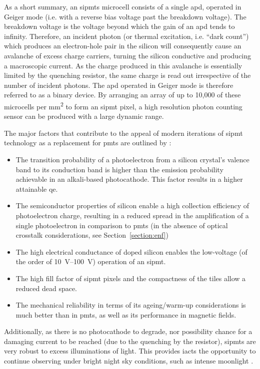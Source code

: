 As a short summary, an \glspl{sipmt} microcell consists of a single \gls{apd}, operated in Geiger mode (i.e. with a reverse bias voltage past the breakdown voltage). The breakdown voltage is the voltage beyond which the gain of an \gls{apd} tends to infinity. Therefore, an incident photon (or thermal excitation, i.e. ``dark count'') which produces an electron-hole pair in the silicon will consequently cause an avalanche of excess charge carriers, turning the silicon conductive and producing a macroscopic current. As the charge produced in this avalanche is essentially limited by the quenching resistor, the same charge is read out irrespective of the number of incident photons. The \gls{apd} operated in Geiger mode is therefore referred to as a binary device. By arranging an array of up to 10,000 of these microcells per \si{mm\squared} to form an \gls{sipmt} pixel, a high resolution photon counting sensor can be produced with a large dynamic range.

The major factors that contribute to the appeal of modern iterations of \gls{sipmt} technology as a replacement for \glspl{pmt} are outlined by \textcite{Ghassemi2017}:
\begin{itemize}
\item The transition probability of a photoelectron from a silicon crystal’s valence band to its conduction band is higher than the emission probability achievable in an alkali-based photocathode. This factor results in a higher attainable \gls{qe}. 
\item The semiconductor properties of silicon enable a high collection efficiency of photoelectron charge, resulting in a reduced spread in the amplification of a single photoelectron in comparison to \glspl{pmt} (in the absence of optical crosstalk considerations, see Section~\ref{section:enf})
\item The high electrical conductance of doped silicon enables the low-voltage (of the order of \SIrange{10}{100}{V}) operation of an \gls{sipmt}.
\item The high fill factor of \gls{sipmt} pixels and the compactness of the tiles allow a reduced dead space.
\item The mechanical reliability in terms of its ageing/warm-up considerations is much better than in \glspl{pmt}, as well as its performance in magnetic fields.
\end{itemize}

Additionally, as there is no photocathode to degrade, nor possibility chance for a damaging current to be reached (due to the quenching by the resistor), \glspl{sipmt} are very robust to excess illuminations of light. This provides \glspl{iact} the opportunity to continue observing under bright night sky conditions, such as intense moonlight \cite{Knoetig2013,Heller2017}.

